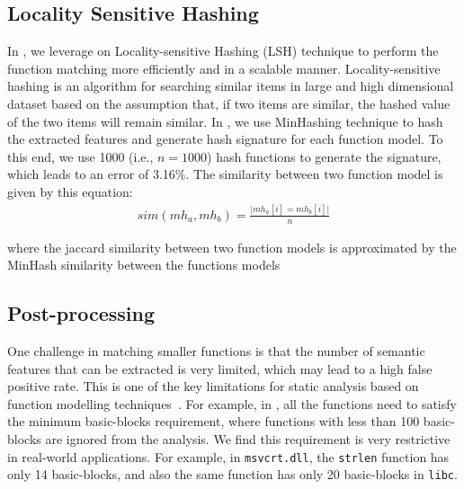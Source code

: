 \subsection{Locality Sensitive Hashing} \label{subsec:lsh}
In \tool, we leverage on Locality-sensitive Hashing (LSH) technique to perform the function matching more efficiently and in a scalable manner. Locality-sensitive hashing is an algorithm for searching similar items in large and high dimensional dataset \cite{DBLP:books/cu/LeskovecRU14} based on the assumption that, if two items are similar, the hashed value of the two items will remain similar. In \tool, we use MinHashing \cite{Broder:1997:RCD:829502.830043} technique to hash the extracted features and generate hash signature for each function model. To this end, we use 1000 (i.e., $n=1000$) hash functions to generate the signature, which leads to an error of 3.16\%. The similarity between two function model is given by this equation: 
\begin{equation}
\begin{aligned}
 sim(mh_a, mh_b) = \frac{\vert mh_a[i]=mh_b[i ]\vert}{n}
\end{aligned}
\end{equation}

where the jaccard similarity between two function models is approximated by the MinHash similarity between the functions models


\subsection{Post-processing} \label{subsubsec:post-proc}
One challenge in matching smaller functions is that the number of semantic features that can be extracted is very limited, which may lead to a high false positive rate. This is one of the key limitations for static analysis based on function modelling techniques~\cite{david2014tracelet,pewnycross}. For example, in \cite{david2014tracelet}, all the functions need to satisfy the minimum basic-blocks requirement, where functions with less than 100 basic-blocks are ignored from the analysis. We find this requirement is very restrictive in real-world applications. For example, in \texttt{msvcrt.dll}, the \texttt{strlen} function has only 14 basic-blocks, and also the same function has only 20 basic-blocks in \texttt{libc}.

